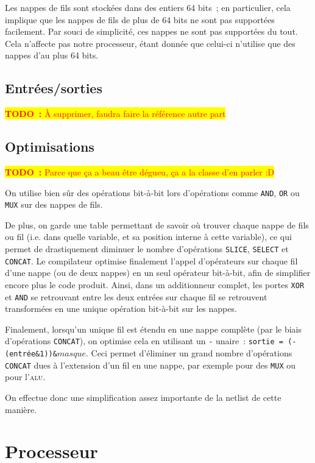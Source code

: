 \documentclass[11pt,a4paper]{article}
\newcommand{\todo}[1]{\colorbox{yellow}{\textcolor{red}{\textbf{TODO~:} #1}}}
\begin{document}
Les nappes de fils sont stockées dans des entiers 64 bits~; en
particulier, cela implique que les nappes de fils de plus de 64 bits
ne sont pas supportées facilement. Par souci de simplicité, ces nappes
ne sont pas supportées du tout. Cela n'affecte pas notre processeur,
étant donnée que celui-ci n'utilise que des nappes d'au plus 64 bits.

\subsection{Entrées/sorties} \label{ssec:compilo_io}
\todo{À supprimer, faudra faire la référence autre part}

\subsection{Optimisations}
\todo{Parce que ça a beau être dégueu, ça a la classe d'en parler :D}

On utilise bien sûr des opérations bit-à-bit lors d'opérations comme
\verb!AND!, \verb!OR! ou \verb!MUX! sur des nappes de fils.

De plus, on garde une table permettant de savoir où trouver chaque
nappe de fils ou fil (i.e. dans quelle variable, et sa position
interne à cette variable), ce qui permet de drastiquement diminuer le
nombre d'opérations \verb!SLICE!, \verb!SELECT! et \verb!CONCAT!. Le
compilateur optimise finalement l'appel d'opérateurs sur chaque fil
d'une nappe (ou de deux nappes) en un seul opérateur bit-à-bit, afin
de simplifier encore plus le code produit. Ainsi, dans un additionneur
complet, les portes \verb!XOR! et \verb!AND! se retrouvant entre les
deux entrées sur chaque fil se retrouvent transformées en une unique
opération bit-à-bit sur les nappes.

Finalement, lorsqu'un unique fil est étendu en une nappe complète (par
le biais d'opérations \verb!CONCAT!), on optimise cela en utilisant un
\verb!-! unaire~: \verb!sortie = (-(entrée&1))&!$masque$. Ceci permet
d'éliminer un grand nombre d'opérations \verb!CONCAT! dues à
l'extension d'un fil en une nappe, par exemple pour des \verb!MUX! ou
pour l'\textsc{alu}.

On effectue donc une simplification assez importante de la netlist de cette manière.


\section{Processeur} \label{sec:proc}
\end{document}
